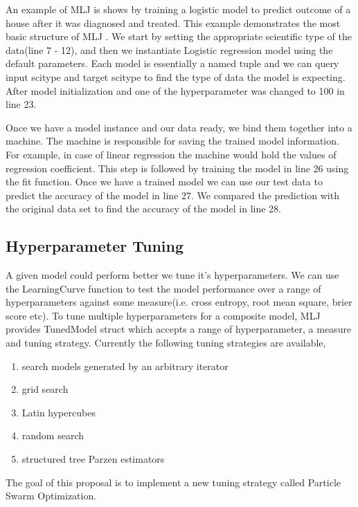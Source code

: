 \documentclass{article}
\begin{document}
An example of MLJ is shows by training a logistic model to predict outcome of a house after it was diagnosed and treated. This example demonstrates the most basic structure of MLJ \cite{irfan_2021OMLJ}. We start by setting the appropriate scientific type of the data(line 7 - 12), and then we instantiate Logistic regression model using the default parameters. Each model is essentially a named tuple and we can query input scitype and target scitype to find the type of data the model is expecting. After model initialization and one of the hyperparameter was changed to 100 in line 23. 

Once we have a model instance and our data ready, we bind them together into a machine. The machine is responsible for saving the trained model information. For example, in case of linear regression the machine would hold the values of regression coefficient. This step is followed by training the model in line 26 using the fit function. Once we have a trained model we can use our test data to predict the accuracy of the model in line 27. We compared the prediction with the original data set to find the accuracy of the model in line 28.

\subsection{Hyperparameter Tuning}
A given model could perform better we tune it's hyperparameters. We can use the LearningCurve function to test the model performance over a range of hyperparameters against some measure(i.e. cross entropy, root mean square, brier score etc). To tune multiple hyperparameters for a composite model, MLJ provides TunedModel struct which accepts a range of hyperparameter, a measure and tuning strategy. Currently the following tuning strategies are available,
\begin{enumerate}
    \item search models generated by an arbitrary iterator
    \item grid search 
    \item Latin hypercubes
    \item random search
    \item structured tree Parzen estimators
\end{enumerate}

The goal of this proposal is to implement a new tuning strategy called Particle Swarm Optimization.
\end{document}
